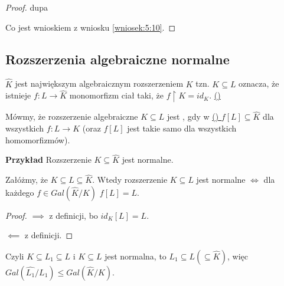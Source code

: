 \begin{proof}{\color{pagColor}dupa}

\begin{center}
\end{center}

Co jest wnioskiem z wniosku \ref{wniosek:5:10}.
\end{proof}

\subsection{Rozszerzenia algebraiczne normalne}

\label{aaaa}
$\hat{K}$ jest największym algebraicznym rozszerzeniem $K$ tzn. $K\subseteq L$ oznacza, że istnieje $f:L\to\hat{K}$ monomorfizm ciał taki, że $f\restriction K=id_K$. \hyperref[aaaa]{{\color{yellow}(\Coffeecup)}}
\medskip

Mówmy, że rozszerzenie algebraiczne $K\subseteq L$ jest , gdy w \hyperref[aaaa]{{\color{yellow}(\Coffeecup)} }$f[L]\subseteq\hat{K}$ dla wszystkich $f:L\to K$ (oraz $f[L]$ jest takie samo dla wszystkich homomorfizmów).

\textbf{Przykład} Rozszerzenie $K\subseteq\hat{K}$ jest normalne.

\begin{remark}\label{uwaga:6:2}
Załóżmy, że $K\subseteq L\subseteq\hat{K}$. Wtedy rozszerzenie $K\subseteq L$ jest normalne $\iff$ dla każdego $f\in Gal(\hat{K}/K)$ $f[L]=L$.
\end{remark}

\begin{proof}
$\implies$ z definicji, bo $id_K[L]=L$.

$\impliedby$ z definicji.

\end{proof}

Czyli $K\subseteq L_1\subseteq L$ i $K\subseteq L$ jest normalna, to $L_1\subseteq L(\subseteq \hat{K})$, więc $Gal(\hat{L_1}/L_1)\leq Gal(\hat{K}/K)$.


